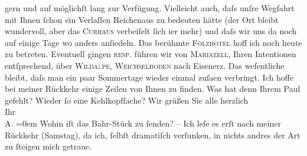 \begin{ledgroupsized}[t]{13cm}
               gern und auf möglichſt lang zur Verfügung. Vielleicht auch, daſs unſre Wegfahrt mit
               Ihnen ſchon ein Verlaſſen Reichenaus zu bedeuten
               hätte (der Ort bleibt wundervoll, aber das \textsc{Curhaus} verbeiſelt ſich i{\geminationm}er mehr) und daſs wir uns da{\geminationn} noch auf einige Tage wo anders anſiedeln. Das berühmte
                  {\pb}\textsc{Fölzhotel} hoff ich noch heute zu betreten. Eventuell gingen \textsc{resp.} führen wir von \textsc{Mariazell}, Ihren Intentionen entſprechend, über \textsc{Wilda\textcolor{gray}{l}pe}, \textsc{Weichselboden} nach Eisenerz. Das weſentliche bleibt, daſs
               man ein paar Sommertage wieder einmal zuſa{\geminationm}en verbringt.
               Ich hoffe bei meiner Rückkehr einige Zeilen von Ihnen zu finden. Was hat denn {\pb}Ihrem Paul gefehlt? Wieder ſo eine Kehlkopfſache? \pend
           \pstart
           Wir grüßen Sie alle herzlich {\\[\baselineskip]}Ihr {\\[\baselineskip]}\spacefill\mbox{A.}\pend
           \leftskip=0em{}\pstart
           \noindent{} Wohin iſt das Bahr-Stück zu ſenden? – Ich leſe es erſt nach
                  meiner Rückkehr \introOben{}(Samstag)\introOben{}, da ich, ſelbſt dramatiſch
                  verſunken, in nichts andres der Art zu ſteigen mich getraue. \pend
           
         
         \endnumbering{}\end{ledgroupsized}\begin{anhang}\end{anhang}\newcommand{\dateiname}{L03000}\newcommand{\titel}{Arthur Schnitzler an Felix Salten, 20. 7. 1905}\newcommand{\editorInnen}{Martin Anton Müller und Laura Untner}
      